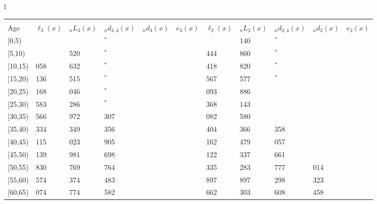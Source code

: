 \documentclass[
]{article}
\begin{document}
\begin{table}
\begin{tabular}[t]{l}
\end{tabular}
\centering
\begin{tabular}[t]{l}
\hline
\begin{tabular}{>{\raggedright\arraybackslash}p{.43in}>{\raggedleft\arraybackslash}p{.42in}>{\raggedleft\arraybackslash}p{.42in}>{\raggedleft\arraybackslash}p{.42in}>{\raggedleft\arraybackslash}p{.42in}>{\raggedleft\arraybackslash}p{.42in}>{\raggedleft\arraybackslash}p{.42in}>{\raggedleft\arraybackslash}p{.42in}>{\raggedleft\arraybackslash}p{.42in}>{\raggedleft\arraybackslash}p{.42in}>{\raggedleft\arraybackslash}p{.42in}}
\toprule
\multicolumn{1}{c}{ } & \multicolumn{5}{c}{(2) Lost mother only} & \multicolumn{5}{c}{(3) Lost father only} \\
\cmidrule(l{3pt}r{3pt}){2-6} \cmidrule(l{3pt}r{3pt}){7-11}
Age & $\ell_{3}(x)$ & ${}_nL_{3}(x)$ & ${}_nd_{3,4}(x)$ & ${}_nd_{3}(x)$ & $e_{3}(x)$ & $\ell_{2}(x)$ & ${}_nL_{2}(x)$ & ${}_nd_{2,4}(x)$ & ${}_nd_{2}(x)$ & $e_{2}(x)$\\
\midrule
{}[0,5) & 0 & 696 & 0$^{*}$ & 2 & 4 & 0 & 3 140 & 0$^{*}$ & 7 & 12\\
{}[5,10) & 330 & 3 520 & 30$^{*}$ & 1 & 4 & 1 444 & 11 860 & 114$^{*}$ & 2 & 12\\
{}[10,15) & 1 058 & 7 632 & 60$^{*}$ & 1 & 4 & 3 418 & 21 820 & 133$^{*}$ & 4 & 12\\
{}[15,20) & 2 136 & 13 515 & 273$^{*}$ & 7 & 3 & 5 567 & 36 577 & 88$^{*}$ & 20 & 12\\
{}[20,25) & 3 168 & 19 046 & 379$^{*}$ & 19 & 3 & 9 093 & 52 886 & 585 & 53 & 11\\
\addlinespace
{}[25,30) & 4 583 & 26 286 & 367$^{*}$ & 33 & 3 & 11 368 & 66 143 & 869 & 83 & 11\\
{}[30,35) & 5 566 & 28 972 & 1 307 & 50 & 3 & 14 082 & 88 580 & 914 & 154 & 10\\
{}[35,40) & 6 334 & 34 349 & 1 356 & 82 & 3 & 18 404 & 111 366 & 1 358 & 266 & 9\\
{}[40,45) & 7 115 & 39 023 & 1 905 & 133 & 2 & 23 162 & 130 479 & 3 057 & 446 & 8\\
{}[45,50) & 8 139 & 44 981 & 2 698 & 209 & 2 & 25 122 & 145 337 & 3 661 & 675 & 7\\
\addlinespace
{}[50,55) & 8 830 & 41 769 & 3 764 & 280 & 2 & 26 335 & 151 283 & 7 777 & 1 014 & 6\\
{}[55,60) & 6 574 & 33 374 & 2 483 & 337 & 1 & 23 897 & 130 897 & 7 298 & 1 323 & 4\\
{}[60,65) & 6 074 & 26 774 & 2 582 & 401 & 1 & 20 662 & 97 303 & 8 608 & 1 458 & 3\\

\end{tabular}
\end{tabular}
\end{table}
\end{document}
